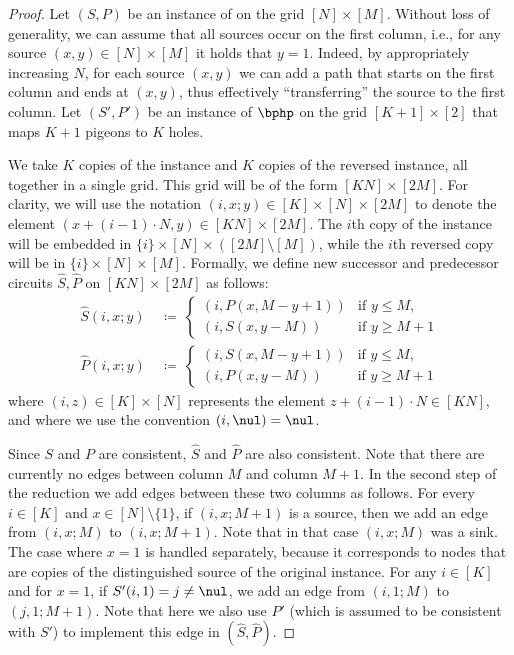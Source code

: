 \begin{proof}
Let $(S,P)$ be an instance of \sopl on the grid $[N] \times [M]$. Without loss of generality, we can assume that all sources occur on the first column, i.e., for any source $(x,y) \in [N] \times [M]$ it holds that $y=1$. Indeed, by appropriately increasing $N$, for each source $(x,y)$ we can add a path that starts on the first column and ends at $(x,y)$, thus effectively ``transferring'' the source to the first column. Let $(S',P')$ be an instance of $\bphp$ on the grid $[K+1] \times [2]$ that maps $K+1$ pigeons to $K$ holes.

We take $K$ copies of the \sopl instance and $K$ copies of the reversed \sopl instance, all together in a single grid. This grid will be of the form $[KN] \times [2M]$. For clarity, we will use the notation $(i,x;y) \in [K] \times [N] \times [2M]$ to denote the element $(x + (i-1) \cdot N,y) \in [KN] \times [2M]$. The $i$th copy of the instance will be embedded in $\{i\} \times [N] \times ([2M] \setminus [M])$, while the $i$th reversed copy will be in $\{i\} \times [N] \times [M]$. Formally, we define new successor and predecessor circuits $\widehat{S}, \widehat{P}$ on $[KN] \times [2M]$ as follows:
\begin{align*}
    \widehat{S}(i,x;y)
    &~\coloneqq~
    \begin{cases}
    (i,P(x,M-y+1)) & \text{if } y \leq M,\\
    (i,S(x,y-M)) & \text{if } y \geq M+1
    \end{cases}\\[1em]
    \widehat{P}(i,x;y)
    &~\coloneqq~
    \begin{cases}
    (i,S(x,M-y+1)) & \text{if } y \leq M,\\
    (i,P(x,y-M)) & \text{if } y \geq M+1
    \end{cases}
\end{align*}
where $(i,z) \in [K] \times [N]$ represents the element $z + (i-1) \cdot N \in [KN]$, and where we use the convention $(i,\nul) = \nul$.

Since $S$ and $P$ are consistent, $\widehat{S}$ and $\widehat{P}$ are also consistent. Note that there are currently no edges between column $M$ and column $M+1$. In the second step of the reduction we add edges between these two columns as follows. For every $i \in [K]$ and $x \in [N] \setminus \{1\}$, if $(i,x;M+1)$ is a source, then we add an edge from $(i,x;M)$ to $(i,x;M+1)$. Note that in that case $(i,x;M)$ was a sink. The case where $x=1$ is handled separately, because it corresponds to nodes that are copies of the distinguished source of the original \sopl instance. For any $i \in [K]$ and for $x=1$, if $S'(i,1) = j \neq \nul$, we add an edge from $(i,1;M)$ to $(j,1;M+1)$. Note that here we also use $P'$ (which is assumed to be consistent with $S'$) to implement this edge in $(\widehat{S},\widehat{P})$.


\end{proof}
